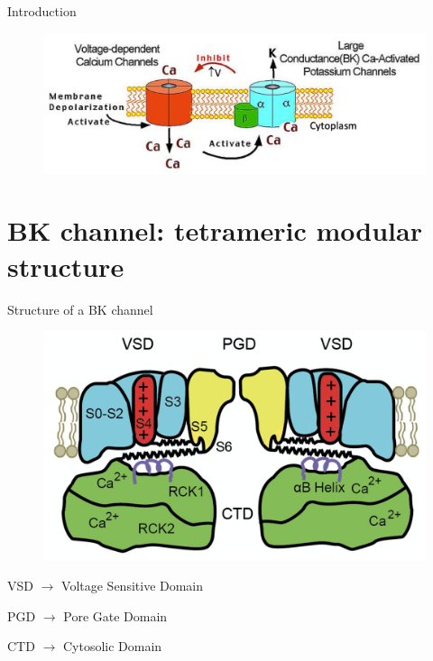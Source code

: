 \documentclass{beamer}
\begin{document}
\begin{frame}{Introduction}
\begin{figure}
\centering
\includegraphics[width=.8\textwidth]{Feedback_Mechanism.png}
\end{figure}
\end{frame}

\section{BK channel: tetrameric modular structure}

\begin{frame}{Structure of a BK channel}
\begin{figure}
\centering
\includegraphics[height=.5\textheight]{BK_Cartoon.png}
\end{figure}
VSD $\rightarrow$ Voltage Sensitive Domain

\vspace{-5pt}
PGD $\rightarrow$ Pore Gate Domain

\vspace{-5pt}
CTD $\rightarrow$ Cytosolic Domain
\end{frame}
\end{document}
